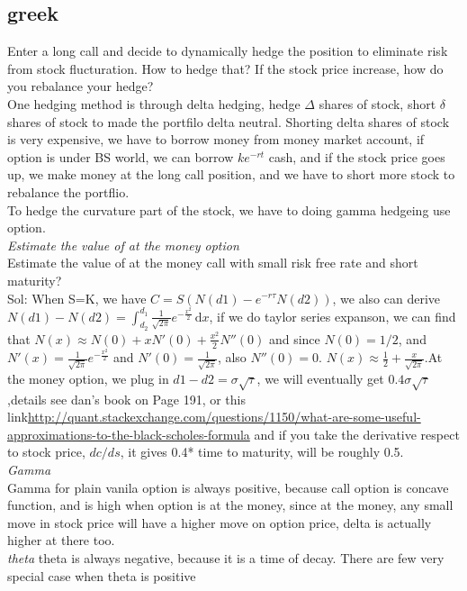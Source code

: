 \documentclass[a4paper,11pt]{article}
\begin{document}
\subsection{greek}
Enter a long call and decide to dynamically hedge the position to eliminate risk from stock flucturation. How to hedge that? If the stock price increase, how do you rebalance your hedge?\\
One hedging method is through delta hedging, hedge $\Delta$ shares of stock, short $\delta$ shares of stock to made the portfilo delta neutral. Shorting delta shares of stock is very expensive, we have to borrow money from money market account, if option is under BS world, we can borrow $ke^{-rt}$ cash, and if the stock price goes up, we make money at the long call position, and we have to short more stock to rebalance the portflio. \\
To hedge the curvature part of the stock, we have to doing gamma hedgeing use option.\\
{\em Estimate the value of at the money option}\\
Estimate the value of at the money call with small risk free rate and short maturity?\\
Sol: When S=K, we have $C=S(N(d1)-e^{-r\tau}N(d2))$, we also can derive $N(d1)-N(d2)=\int_{d_2}^{d_1} \! \frac{1}{\sqrt{2\pi}} e^{-\frac{x^{2}}{2}}\, \mathrm{d}x$, if we do taylor series expanson, we can find that $N(x)\approx  N(0)+xN'(0)+\frac{x^2}{2}N''(0)$ and since $N(0)=1/2$, and $N'(x)=\frac{1}{\sqrt{2\pi}}e^{-\frac{x^2}{2}}$ and $N'(0)=\frac{1}{\sqrt{2\pi}}$, also $N''(0)=0$. $N(x)\approx \frac{1}{2}+\frac{x}{\sqrt{2\pi}}$.At the money option, we plug in $d1-d2=\sigma\sqrt{\tau}$, we will eventually get $0.4\sigma\sqrt{\tau}$,details see dan's book on Page 191, or this link\url{http://quant.stackexchange.com/questions/1150/what-are-some-useful-approximations-to-the-black-scholes-formula}
and if you take the derivative respect to stock price, $dc/ds$, it gives 0.4* time to maturity, will be roughly 0.5.\\
{\em Gamma}\\Gamma for plain vanila option is always positive, because call option is concave function, and is high when option is at the money, since at the money, any small move in stock price will have a higher move on option price, delta is actually higher at there too. \\
{\em theta} theta is always negative, because it is a time of decay. There are few very special case when theta is positive\\
\end{document}
